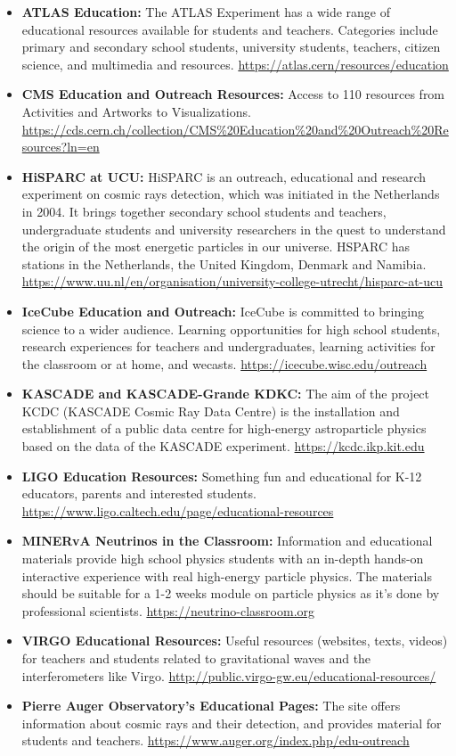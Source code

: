\begin{itemize}
\item
  \textbf{ATLAS Education:} The ATLAS Experiment has a wide range of
  educational resources available for students and teachers. Categories
  include primary and secondary school students, university students,
  teachers, citizen science, and multimedia and resources.
  \url{https://atlas.cern/resources/education}
\item
  \textbf{CMS Education and Outreach Resources:} Access to 110 resources
  from Activities and Artworks to Visualizations.
  \url{https://cds.cern.ch/collection/CMS\%20Education\%20and\%20Outreach\%20Resources?ln=en}
\item
  \textbf{HiSPARC at UCU:} HiSPARC is an outreach, educational and
  research experiment on cosmic rays detection, which was initiated in
  the Netherlands in 2004. It brings together secondary school students
  and teachers, undergraduate students and university researchers in the
  quest to understand the origin of the most energetic particles in our
  universe. HSPARC has stations in the Netherlands, the United Kingdom,
  Denmark and Namibia.
  \url{https://www.uu.nl/en/organisation/university-college-utrecht/hisparc-at-ucu}
\item
  \textbf{IceCube Education and Outreach:} IceCube is committed to
  bringing science to a wider audience. Learning opportunities for high
  school students, research experiences for teachers and undergraduates,
  learning activities for the classroom or at home, and wecasts.
  \url{https://icecube.wisc.edu/outreach}
\item
  \textbf{KASCADE and KASCADE-Grande KDKC:} The aim of the project KCDC
  (KASCADE Cosmic Ray Data Centre) is the installation and establishment
  of a public data centre for high-energy astroparticle physics based on
  the data of the KASCADE experiment. \url{https://kcdc.ikp.kit.edu}
\item
  \textbf{LIGO Education Resources:} Something fun and educational for
  K-12 educators, parents and interested students.
  \url{https://www.ligo.caltech.edu/page/educational-resources}
\item
  \textbf{MINERvA Neutrinos in the Classroom:} Information and
  educational materials provide high school physics students with an
  in-depth hands-on interactive experience with real high-energy
  particle physics. The materials should be suitable for a 1-2 weeks
  module on particle physics as it's done by professional scientists.
  \url{https://neutrino-classroom.org}
\item
  \textbf{VIRGO Educational Resources:} Useful resources (websites,
  texts, videos) for teachers and students related to gravitational
  waves and the interferometers like Virgo.
  \url{http://public.virgo-gw.eu/educational-resources/}
\item
  \textbf{Pierre Auger Observatory's Educational Pages:} The site offers
  information about cosmic rays and their detection, and provides
  material for students and teachers.
  \url{https://www.auger.org/index.php/edu-outreach}
\end{itemize}

